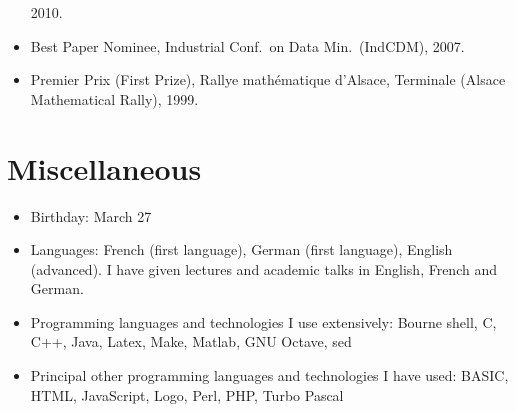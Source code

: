 \documentclass[line,mm]{res}
\newcounter{x}
\newcounter{y}
\begin{document}
\begin{resume}
\begin{itemize}
    2010.  
  \item 
    Best Paper Nominee, Industrial Conf.\ on Data Min.\ (IndCDM), 2007.    
  \item 
    Premier Prix (First Prize), Rallye mathématique d'Alsace, Terminale (Alsace Mathematical Rally), 1999. 
\end{itemize}

\section{Miscellaneous}
\begin{itemize}
  \item Birthday:  March 27
  \item Languages: French (first language), German (first language),
    English (advanced).  I have given lectures and academic talks in English, French and German. 
  \item Programming languages and technologies I use extensively:
    Bourne shell, C, C++, Java, Latex, Make, Matlab, GNU Octave, sed
  \item Principal other programming languages and technologies I have used:
    BASIC, HTML, JavaScript, Logo, Perl, PHP, Turbo Pascal 
\end{itemize}

\end{resume}
\end{document}
